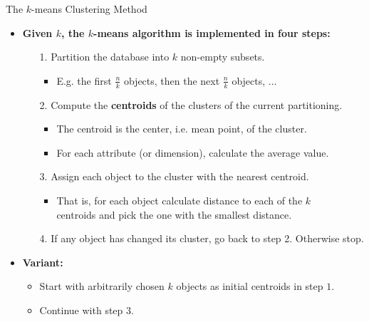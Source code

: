 \begin{frame}{The $k$-means Clustering Method}
	\begin{itemize}
		\item \textbf{Given $k$, the $k$-means algorithm is implemented in four
			      steps:}
		      \begin{itemize}
			      \item[1.] Partition the database into $k$ non-empty subsets.
			            \begin{itemize}
				            \item E.g. the first $\frac{n}{k}$ objects, then the next
				                  $\frac{n}{k}$ objects, $\ldots$
			            \end{itemize}
			      \item[2.] Compute the \textbf{\color{airforceblue}centroids} of the clusters of the
			            current partitioning.
			            \begin{itemize}
				            \item The centroid is the center, i.e. mean point, of the
				                  cluster.
				            \item For each attribute (or dimension), calculate the average
				                  value.
			            \end{itemize}
			      \item[3.] Assign each object to the cluster with the nearest
			            centroid.
			            \begin{itemize}
				            \item That is, for each object calculate distance to each of
				                  the $k$\\
				                  centroids and pick the one with the smallest distance.
			            \end{itemize}
			      \item[4.] If any object has changed its cluster, go back to step 2.
			            Otherwise stop.
		      \end{itemize}
		\item \textbf{Variant:}
		      \begin{itemize}
			      \item Start with arbitrarily chosen $k$ objects as initial
			            centroids in step $1$.
			      \item Continue with step $3$.
		      \end{itemize}
	\end{itemize}
\end{frame}

